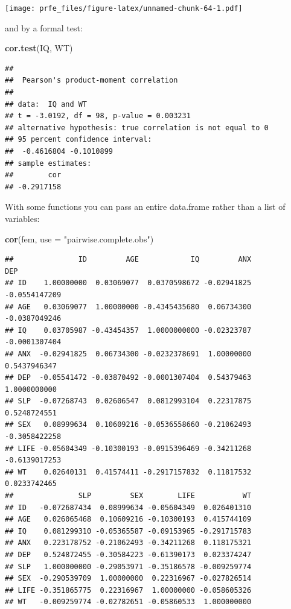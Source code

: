 \documentclass[12pt,]{book}
\newenvironment{Shaded}{\begin{snugshade}}{\end{snugshade}}
\newcommand{\KeywordTok}[1]{\textcolor[rgb]{0.13,0.29,0.53}{\textbf{#1}}}
\newcommand{\DataTypeTok}[1]{\textcolor[rgb]{0.13,0.29,0.53}{#1}}
\newcommand{\StringTok}[1]{\textcolor[rgb]{0.31,0.60,0.02}{#1}}
\newcommand{\NormalTok}[1]{#1}
\theoremstyle{definition}
\theoremstyle{definition}
\theoremstyle{definition}
\theoremstyle{remark}
\begin{document}
\texttt{[image: prfe\_files/figure-latex/unnamed-chunk-64-1.pdf]}

and by a formal test:

\begin{Shaded}
\begin{Highlighting}[]
\KeywordTok{cor.test}\NormalTok{(IQ, WT)}
\end{Highlighting}
\end{Shaded}

\begin{verbatim}
## 
##  Pearson's product-moment correlation
## 
## data:  IQ and WT
## t = -3.0192, df = 98, p-value = 0.003231
## alternative hypothesis: true correlation is not equal to 0
## 95 percent confidence interval:
##  -0.4616804 -0.1010899
## sample estimates:
##        cor 
## -0.2917158
\end{verbatim}

With some functions you can pass an entire data.frame rather than a list
of variables:

\begin{Shaded}
\begin{Highlighting}[]
\KeywordTok{cor}\NormalTok{(fem, }\DataTypeTok{use =} \StringTok{"pairwise.complete.obs"}\NormalTok{)}
\end{Highlighting}
\end{Shaded}

\begin{verbatim}
##               ID         AGE            IQ         ANX           DEP
## ID    1.00000000  0.03069077  0.0370598672 -0.02941825 -0.0554147209
## AGE   0.03069077  1.00000000 -0.4345435680  0.06734300 -0.0387049246
## IQ    0.03705987 -0.43454357  1.0000000000 -0.02323787 -0.0001307404
## ANX  -0.02941825  0.06734300 -0.0232378691  1.00000000  0.5437946347
## DEP  -0.05541472 -0.03870492 -0.0001307404  0.54379463  1.0000000000
## SLP  -0.07268743  0.02606547  0.0812993104  0.22317875  0.5248724551
## SEX   0.08999634  0.10609216 -0.0536558660 -0.21062493 -0.3058422258
## LIFE -0.05604349 -0.10300193 -0.0915396469 -0.34211268 -0.6139017253
## WT    0.02640131  0.41574411 -0.2917157832  0.11817532  0.0233742465
##               SLP         SEX        LIFE           WT
## ID   -0.072687434  0.08999634 -0.05604349  0.026401310
## AGE   0.026065468  0.10609216 -0.10300193  0.415744109
## IQ    0.081299310 -0.05365587 -0.09153965 -0.291715783
## ANX   0.223178752 -0.21062493 -0.34211268  0.118175321
## DEP   0.524872455 -0.30584223 -0.61390173  0.023374247
## SLP   1.000000000 -0.29053971 -0.35186578 -0.009259774
## SEX  -0.290539709  1.00000000  0.22316967 -0.027826514
## LIFE -0.351865775  0.22316967  1.00000000 -0.058605326
## WT   -0.009259774 -0.02782651 -0.05860533  1.000000000
\end{verbatim}
\end{document}
